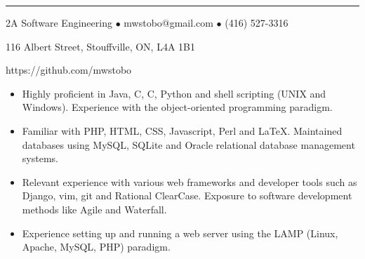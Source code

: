 \documentclass[10pt,letterpaper]{article}
\newcommand{\CPP}
{C\nolinebreak[4]\hspace{-.05em}\raisebox{.22ex}{\footnotesize\bf ++}}
\begin{document}
\vspace{0.8em}
\hrule
\vspace{0.4em}


\hfill 2A Software Engineering $\bullet$ 
mwstobo@gmail.com $\bullet$ (416) 527-3316

\hfill116 Albert Street, Stouffville, ON, L4A 1B1

\hfill https://github.com/mwstobo

\smallskip

\raggedright

\begin{itemize}
\parskip=0.1em
\item Highly proficient in Java, \CPP, C, Python and shell scripting (UNIX and Windows).  Experience with the object-oriented programming paradigm.
\item Familiar with PHP, HTML, CSS, Javascript, Perl and \LaTeX.  Maintained databases using MySQL, SQLite and Oracle relational database management systems.
\item Relevant experience with various web frameworks and developer tools such as Django, vim, git and Rational ClearCase.  Exposure to software development methods like Agile and Waterfall.
\item Experience setting up and running a web server using the LAMP (Linux, Apache, MySQL, PHP) paradigm.
\end{itemize}
\end{document}
